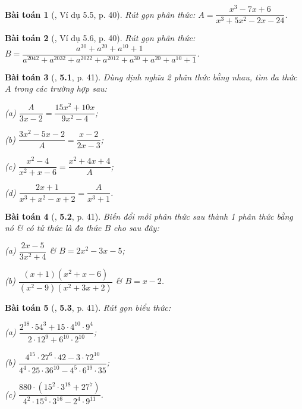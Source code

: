 \documentclass{article}
\numberwithin{equation}{section}
\newtheorem{baitoan}{Bài toán}[section]
\begin{document}
\begin{baitoan}[\cite{Binh_Nam_Ngoc_Son_Toan_8_Dai_So}, Ví dụ 5.5, p. 40]
	Rút gọn phân thức: $A = \dfrac{x^3 - 7x + 6}{x^3 + 5x^2 - 2x - 24}$.
\end{baitoan}

\begin{baitoan}[\cite{Binh_Nam_Ngoc_Son_Toan_8_Dai_So}, Ví dụ 5.6, p. 40]
	Rút gọn phân thức: $B = \dfrac{a^{30} + a^{20} + a^{10} + 1}{a^{2042} + a^{2032} + a^{2022} + a^{2012} + a^{30} + a^{20} + a^{10} + 1}$.
\end{baitoan}

\begin{baitoan}[\cite{Binh_Nam_Ngoc_Son_Toan_8_Dai_So}, \textbf{5.1}, p. 41]
	Dùng định nghĩa 2 phân thức bằng nhau, tìm đa thức $A$ trong các trường hợp sau:
	\begin{enumerate*}
		\item[(a)] $\dfrac{A}{3x - 2} = \dfrac{15x^2 + 10x}{9x^2 - 4}$;
		\item[(b)] $\dfrac{3x^2 - 5x - 2}{A} = \dfrac{x - 2}{2x - 3}$;
		\item[(c)] $\dfrac{x^2 - 4}{x^2 + x - 6} = \dfrac{x^2 + 4x + 4}{A}$;
		\item[(d)] $\dfrac{2x + 1}{x^3 + x^2 - x + 2} = \dfrac{A}{x^3 + 1}$.
	\end{enumerate*}
\end{baitoan}

\begin{baitoan}[\cite{Binh_Nam_Ngoc_Son_Toan_8_Dai_So}, \textbf{5.2}, p. 41]
	Biến đổi mỗi phân thức sau thành 1 phân thức bằng nó \& có tử thức là đa thức $B$ cho sau đây:
	\begin{enumerate*}
		\item[(a)] $\dfrac{2x - 5}{3x^2 + 4}$ \& $B = 2x^2 - 3x - 5$;
		\item[(b)] $\dfrac{(x + 1)(x^2 + x - 6)}{(x^2 - 9)(x^2 + 3x + 2)}$ \& $B = x - 2$.
	\end{enumerate*}
\end{baitoan}

\begin{baitoan}[\cite{Binh_Nam_Ngoc_Son_Toan_8_Dai_So}, \textbf{5.3}, p. 41]
	Rút gọn biểu thức:
	\begin{enumerate*}
		\item[(a)] $\dfrac{2^{18}\cdot 54^3 + 15\cdot 4^{10}\cdot 9^4}{2\cdot 12^9 + 6^{10}\cdot 2^{10}}$;
		\item[(b)] $\dfrac{4^{15}\cdot 27^6\cdot 42 - 3\cdot 72^{10}}{4^4\cdot 25\cdot 36^{10}  - 4^5\cdot 6^{19}\cdot 35}$;
		\item[(c)] $\dfrac{880\cdot(15^2\cdot 3^{18} + 27^7)}{4^2\cdot 15^4\cdot 3^{16} - 2^4\cdot 9^{11}}$.
	\end{enumerate*}
\end{baitoan}
\end{document}

